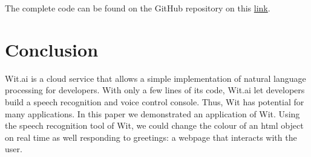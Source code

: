 \documentclass[twoside,11pt]{article}
\begin{document}
The complete code can be found on the GitHub repository on this \href{https://github.com/andreeds/cs807-research-tasks/tree/master/B\%20-\%20The\%20Platform/Wit}{link}.

\section{Conclusion}
\label{sec:conc}

Wit.ai is a cloud service that allows a simple implementation of natural language processing for developers.
With only a few lines of its code, Wit.ai let developers build a speech recognition and voice control console.
Thus, Wit has potential for many applications.
In this paper we demonstrated an application of Wit.
Using the speech recognition tool of Wit, we could change the colour of an html object on real time as well responding to greetings: a webpage that interacts with the user.






\vskip 0.2in

\end{document}

